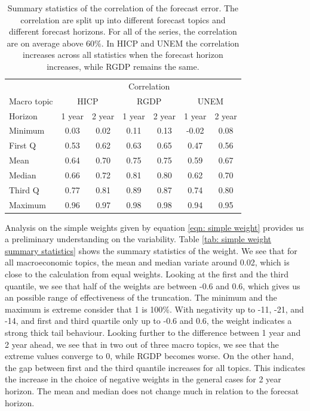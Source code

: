 \documentclass[]{article}
\begin{document}
\begin{table}[!h]
\centering
\caption{Summary statistics of the correlation of the forecast error. The correlation are split up into different forecast topics and different forecast horizons. For all of the series, the correlation are on average above 60\%. In HICP and UNEM the correlation increases across all statistics when the forecast horizon increases, while RGDP remains the same.}
\label{tab: correlation summary statistics}
\begin{tabular}{lcccccc}%
\hline
&\multicolumn{6}{c}{Correlation}\\
\cmidrule{2-7}
Macro topic & \multicolumn{2}{c}{HICP} & \multicolumn{2}{c}{RGDP} & \multicolumn{2}{c}{UNEM} \\
\cmidrule{2-3} \cmidrule{4-5}\cmidrule{6-7}
Horizon     & 1 year & 2 year & 1 year & 2 year & 1 year & 2 year \\ 
\cmidrule{2-2} \cmidrule{3-3} \cmidrule{4-4} \cmidrule{5-5} \cmidrule{6-6} \cmidrule{7-7}
Minimum     & 0.03        & 0.02        & 0.11        & 0.13        & -0.02        & 0.08       \\
First Q     & 0.53        & 0.62        & 0.63        & 0.65        & 0.47         & 0.56       \\
Mean        & 0.64        & 0.70        & 0.75        & 0.75        & 0.59         & 0.67       \\
Median      & 0.66        & 0.72        & 0.81        & 0.80        & 0.62         & 0.70       \\
Third Q     & 0.77        & 0.81        & 0.89        & 0.87        & 0.74         & 0.80       \\
Maximum     & 0.96        & 0.97        & 0.98        & 0.98        & 0.94         & 0.95       \\ 
\hline
\end{tabular}
\end{table}

Analysis on the simple weights given by equation
\ref{eqn: simple weight} provides us a preliminary understanding on the
variability. Table \ref{tab: simple weight summary statistics} shows the
summary statistics of the weight. We see that for all macroeconomic
topics, the mean and median variate around 0.02, which is close to the
calculation from equal weights. Looking at the first and the third
quantile, we see that half of the weights are between -0.6 and 0.6,
which gives us an possible range of effectiveness of the truncation. The
minimum and the maximum is extreme consider that 1 is 100\%. With
negativity up to -11, -21, and -14, and first and third quartile only up
to -0.6 and 0.6, the weight indicates a strong thick tail behaviour.
Looking further to the difference between 1 year and 2 year ahead, we
see that in two out of three macro topics, we see that the extreme
values converge to 0, while RGDP becomes worse. On the other hand, the
gap between first and the third quantile increases for all topics. This
indicates the increase in the choice of negative weights in the general
cases for 2 year horizon. The mean and median does not change much in
relation to the forecsat horizon.
\end{document}
